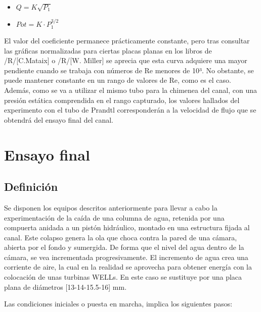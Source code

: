 \begin{itemize}
\item
  \(Q=K\sqrt{P_1}\)
\item
  \(Pot= K·P_1^{3/2}\)
\end{itemize}

El valor del coeficiente permanece prácticamente constante, pero tras
consultar las gráficas normalizadas para ciertas placas planas en los
libros de /R/{[}C.Mataix{]} o /R/{[}W. Miller{]} se aprecia que esta
curva adquiere una mayor pendiente cuando se trabaja con números de Re
menores de 10³. No obstante, se puede mantener constante en un rango de
valores de Re, como es el caso. Además, como se va a utilizar el mismo
tubo para la chimenea del canal, con una presión estática comprendida en
el rango capturado, los valores hallados del experimento con el tubo de
Prandtl corresponderán a la velocidad de flujo que se obtendrá del
ensayo final del canal.

\section{Ensayo final}\label{header-n514}

\subsection{Definición}\label{header-n515}

Se disponen los equipos descritos anteriormente para llevar a cabo la
experimentación de la caída de una columna de agua, retenida por una
compuerta anidada a un pistón hidráulico, montado en una estructura
fijada al canal. Este colapso genera la ola que choca contra la pared de
una cámara, abierta por el fondo y sumergida. De forma que el nivel del
agua dentro de la cámara, se vea incrementada progresivamente. El
incremento de agua crea una corriente de aire, la cual en la realidad se
aprovecha para obtener energía con la colocación de unas turbinas WELLs.
En este caso se sustituye por una placa plana de diámetros
{[}13-14-15.5-16{]} mm.

Las condiciones iniciales o puesta en marcha, implica los siguientes
pasos:

